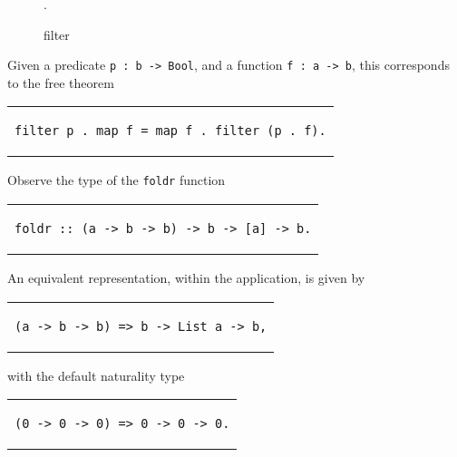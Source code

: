 \documentclass[../Dissertation.tex]{subfiles}
\begin{document}
\begin{figure}[H]
  \begin{center}
    .
  \end{center}
  \caption{filter}
  \label{fig:petrifilter}
\end{figure}
\noindent
Given a predicate \lstinline{p : b -> Bool}, and a function \lstinline{f : a -> b}, this corresponds to the free theorem
\begin{center}
\begin{tabular}{c}
\begin{lstlisting}
filter p . map f = map f . filter (p . f).
\end{lstlisting}
\end{tabular}
\end{center}
\par
Observe the type of the \lstinline{foldr} function
\begin{center}
\begin{tabular}{c}
\begin{lstlisting}
foldr :: (a -> b -> b) -> b -> [a] -> b.
\end{lstlisting}
\end{tabular}
\end{center}
An equivalent representation, within the application, is given by
\begin{center}
\begin{tabular}{c}
\begin{lstlisting}
(a -> b -> b) => b -> List a -> b,
\end{lstlisting}
\end{tabular}
\end{center}
with the default naturality type
\begin{center}
\begin{tabular}{c}
\begin{lstlisting}
(0 -> 0 -> 0) => 0 -> 0 -> 0.
\end{lstlisting}
\end{tabular}
\end{center}
\end{document}
